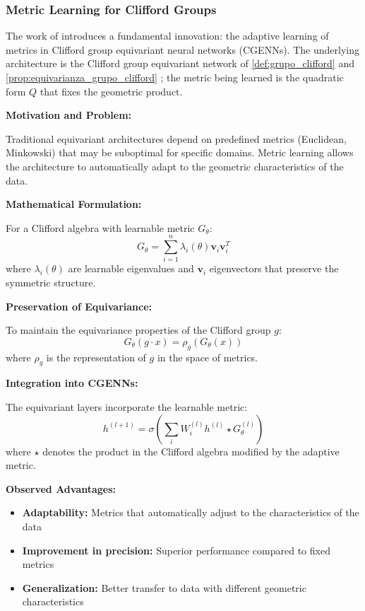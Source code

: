 \subsubsection{Metric Learning for Clifford Groups}

The work of \citet{ali2024metriclearning} introduces a fundamental innovation: the adaptive learning of metrics in Clifford group equivariant neural networks (CGENNs). The underlying architecture is the Clifford group equivariant network of \autoref{def:grupo_clifford} and \autoref{prop:equivarianza_grupo_clifford} \citep{ruhe2023cliffordgroup, ali2024metriclearning}; the metric being learned is the quadratic form $Q$ that fixes the geometric product.

\textbf{Motivation and Problem:}

Traditional equivariant architectures depend on predefined metrics (Euclidean, Minkowski) that may be suboptimal for specific domains. Metric learning allows the architecture to automatically adapt to the geometric characteristics of the data.

\textbf{Mathematical Formulation:}

For a Clifford algebra with learnable metric $G_\theta$:
\[G_\theta = \sum_{i=1}^n \lambda_i(\theta) \mathbf{v}_i \mathbf{v}_i^T\]
where $\lambda_i(\theta)$ are learnable eigenvalues and $\mathbf{v}_i$ eigenvectors that preserve the symmetric structure.

\textbf{Preservation of Equivariance:}

To maintain the equivariance properties of the Clifford group $g$:
\[G_\theta(g \cdot x) = \rho_g(G_\theta(x))\]
where $\rho_g$ is the representation of $g$ in the space of metrics.

\textbf{Integration into CGENNs:}

The equivariant layers incorporate the learnable metric:
\[h^{(l+1)} = \sigma\left(\sum_i W_i^{(l)} h^{(l)} \star G_\theta^{(l)}\right)\]
where $\star$ denotes the product in the Clifford algebra modified by the adaptive metric.

\textbf{Observed Advantages:}
\begin{itemize}
    \item \textbf{Adaptability:} Metrics that automatically adjust to the characteristics of the data
    \item \textbf{Improvement in precision:} Superior performance compared to fixed metrics
    \item \textbf{Generalization:} Better transfer to data with different geometric characteristics
\end{itemize}

